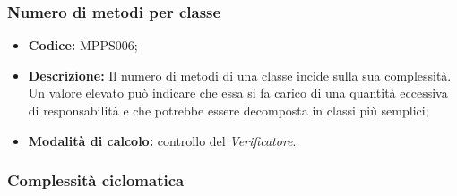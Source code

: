 \documentclass[../NormediProgetto.tex]{subfiles}
\begin{document}
\subsubsection{Numero di metodi per classe}

\begin{itemize}
	\item \textbf{Codice:} MPPS006;
	
	\item \textbf{Descrizione:} Il numero di metodi di una classe incide sulla sua complessità. Un valore elevato può indicare che essa si fa carico di una quantità eccessiva di responsabilità e che potrebbe essere decomposta in classi più semplici;
	
	\item \textbf{Modalità di calcolo:} controllo del \textit{Verificatore}.
\end{itemize}

\subsubsection{Complessità ciclomatica}
\end{document}
